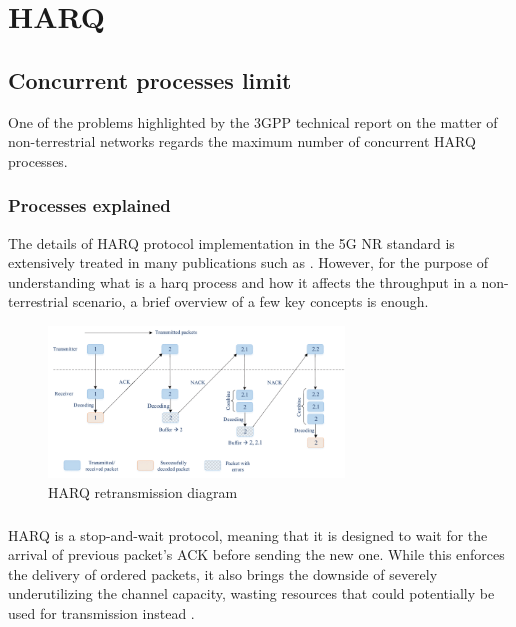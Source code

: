 
\chapter{HARQ}
\label{chp:analysis}

\section{Concurrent processes limit}

One of the problems highlighted by the \ac{3GPP} technical report \cite{3gpp-tr-38.811} on the matter of non-terrestrial networks regards the maximum number of concurrent \ac{HARQ} processes. 

\subsection{Processes explained}
The details of \ac{HARQ} protocol implementation in the 5G \ac{NR} standard is extensively treated in many publications such as \cite{harq-wireless-communications-survey}. However, for the purpose of understanding what is a harq process and how it affects the throughput in a non-terrestrial scenario, a brief overview of a few key concepts is enough.

\begin{figure}[ht]
    \centering
    \includegraphics[width=0.7\textwidth]{res/harq-retx-scheme.png}
    \caption{\ac{HARQ} retransmission diagram \cite{harq-wireless-communications-survey}}
    \label{fig:harq_retx_scheme}
\end{figure}


\paragraph{}\ac{HARQ} is a stop-and-wait protocol, meaning that it is designed to wait for the arrival of previous packet's \ac{ACK} before sending the new one. While this enforces the delivery of ordered packets, it also brings the downside of severely underutilizing the channel capacity, wasting resources that could potentially be used for transmission instead \cite{3gpp-ts-38.214}.

